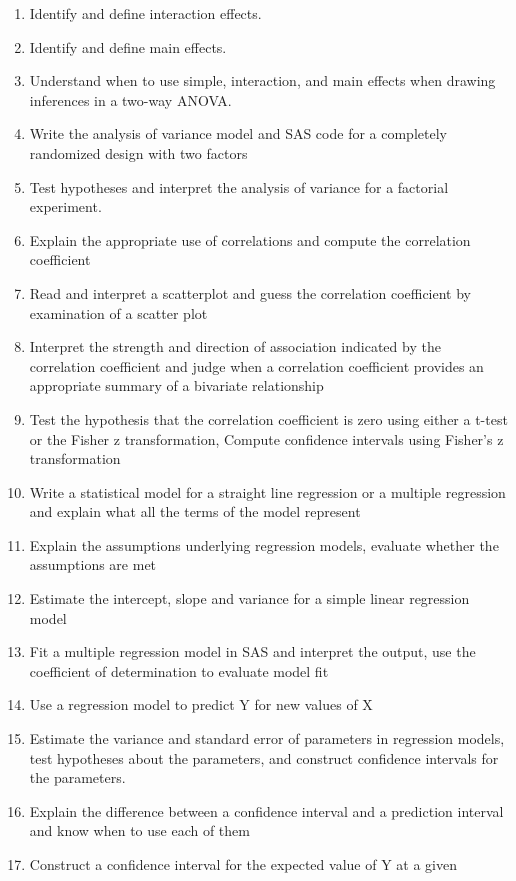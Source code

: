 \documentclass[]{book}
\theoremstyle{definition}
\theoremstyle{definition}
\theoremstyle{definition}
\theoremstyle{remark}
\begin{document}
\begin{enumerate}
\item
  Identify and define interaction effects.
\item
  Identify and define main effects.
\item
  Understand when to use simple, interaction, and main effects when
  drawing inferences in a two-way ANOVA.
\item
  Write the analysis of variance model and SAS code for a completely
  randomized design with two factors
\item
  Test hypotheses and interpret the analysis of variance for a factorial
  experiment.
\item
  Explain the appropriate use of correlations and compute the
  correlation coefficient
\item
  Read and interpret a scatterplot and guess the correlation coefficient
  by examination of a scatter plot
\item
  Interpret the strength and direction of association indicated by the
  correlation coefficient and judge when a correlation coefficient
  provides an appropriate summary of a bivariate relationship
\item
  Test the hypothesis that the correlation coefficient is zero using
  either a t-test or the Fisher z transformation, Compute confidence
  intervals using Fisher's z transformation
\item
  Write a statistical model for a straight line regression or a multiple
  regression and explain what all the terms of the model represent
\item
  Explain the assumptions underlying regression models, evaluate whether
  the assumptions are met
\item
  Estimate the intercept, slope and variance for a simple linear
  regression model
\item
  Fit a multiple regression model in SAS and interpret the output, use
  the coefficient of determination to evaluate model fit
\item
  Use a regression model to predict Y for new values of X
\item
  Estimate the variance and standard error of parameters in regression
  models, test hypotheses about the parameters, and construct confidence
  intervals for the parameters.
\item
  Explain the difference between a confidence interval and a prediction
  interval and know when to use each of them
\item
  Construct a confidence interval for the expected value of Y at a given

\end{enumerate}
\end{document}
